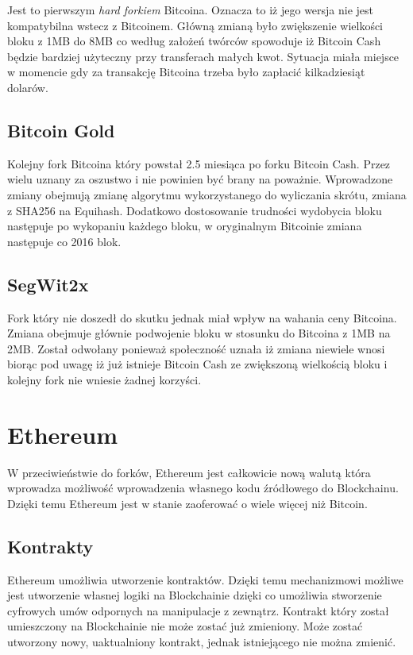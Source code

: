 \documentclass[conference]{IEEEtran}
\begin{document}
Jest to pierwszym \textit{hard forkiem} Bitcoina. Oznacza to iż jego wersja nie jest kompatybilna wstecz z Bitcoinem.
Główną zmianą było zwiększenie wielkości bloku z 1MB do 8MB co według założeń twórców spowoduje iż Bitcoin Cash będzie
bardziej użyteczny przy transferach małych kwot. Sytuacja miała miejsce w momencie gdy za transakcję Bitcoina trzeba
było zapłacić kilkadziesiąt dolarów.

\subsection{Bitcoin Gold}

Kolejny fork Bitcoina który powstał 2.5 miesiąca po forku Bitcoin Cash. Przez wielu uznany za oszustwo i nie powinien
być brany na poważnie. Wprowadzone zmiany obejmują zmianę algorytmu wykorzystanego do wyliczania skrótu, zmiana z SHA256
na Equihash. Dodatkowo dostosowanie trudności wydobycia bloku następuje po wykopaniu każdego bloku, w oryginalnym
Bitcoinie zmiana następuje co 2016 blok.

\subsection{SegWit2x}

Fork który nie doszedł do skutku jednak miał wpływ na wahania ceny Bitcoina. Zmiana obejmuje głównie podwojenie bloku w
stosunku do Bitcoina z 1MB na 2MB. Został odwołany ponieważ społeczność uznała iż zmiana niewiele wnosi biorąc pod uwagę
iż już istnieje Bitcoin Cash ze zwiększoną wielkością bloku i kolejny fork nie wniesie żadnej korzyści.

\section{Ethereum}

W przeciwieństwie do forków, Ethereum jest całkowicie nową walutą która wprowadza możliwość wprowadzenia własnego kodu
źródłowego do Blockchainu. Dzięki temu Ethereum jest w stanie zaoferować o wiele więcej niż Bitcoin.

\subsection{Kontrakty}

Ethereum umożliwia utworzenie kontraktów. Dzięki temu mechanizmowi możliwe jest utworzenie własnej logiki na
Blockchainie dzięki co umożliwia stworzenie cyfrowych umów odpornych na manipulacje z zewnątrz.  Kontrakt który został
umieszczony na Blockchainie nie może zostać już zmieniony. Może zostać utworzony nowy, uaktualniony kontrakt, jednak
istniejącego nie można zmienić.
\end{document}
